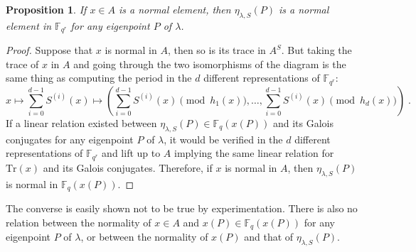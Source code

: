 \documentclass[12pt]{article}
\theoremstyle{plain}
\newtheorem{proposition}[theorem]{Proposition}
\theoremstyle{definition}
\def\F{\ensuremath{\mathbb{F}}}
\begin{document}
\begin{proposition}
\label{prop:xnormal}
If $x \in A$ is a normal element,
then $\eta_{\lambda,S}(P)$ is a normal element in $\F_{q^r}$
for any eigenpoint $P$ of $\lambda$.
\end{proposition}

\begin{proof}
Suppose that $x$ is normal in $A$, then so is its trace in $A^S$.
But taking the trace of $x$ in $A$ and going through the two isomorphisms
of the diagram is the same thing as computing the period in the
$d$ different representations of $\F_{q^r}$:
\[
x \mapsto \sum_{i=0}^{d-1} S^{(i)}(x) \mapsto
\left( \sum_{i=0}^{d-1} S^{(i)}(x) \pmod{h_1(x)}, \ldots,
\sum_{i=0}^{d-1} S^{(i)}(x) \pmod{h_d(x)} \right) \; .
\]
If a linear relation existed between $\eta_{\lambda,S}(P) \in \F_q(x(P))$
and its Galois conjugates for any eigenpoint $P$ of $\lambda$,
it would be verified in the $d$ different representations of $\F_{q^r}$
and lift up to $A$ implying the same linear relation for
$\mathrm{Tr}(x)$ and its Galois conjugates.
Therefore, if $x$ is normal in $A$,
then $\eta_{\lambda,S}(P)$ is normal in $\F_q(x(P))$.
\end{proof}

The converse is easily shown not to be true by experimentation.
There is also no relation between the normality of $x \in A$
and $x(P) \in \F_q(x(P))$ for any eigenpoint $P$ of $\lambda$,
or between the normality of $x(P)$ and that of $\eta_{\lambda,S}(P)$.
\end{document}
